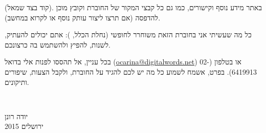 (קוד  בצד שמאל). באתר מידע נוסף וקישורים, כמו גם כל קבצי המקור של החוברת וקובץ מוכן להדפסה (אם תרצו ליצור עותק נוסף או לקרוא במחשב).

כל מה שעשיתי אני בחוברת הזאת משוחרר לחופשי (נחלת הכלל, ): אתם יכולים להעתיק, לשנות, להפיץ ולהשתמש בה כרצונכם.

בכל עניין, אל תהססו לפנות אלי בדואל (\url{ocarina@digitalwords.net}) או בטלפון (02-6419913). בפרט, אשמח לשמוע כל מה יש לכם להגיד על החוברת, ולקבל הצעות, שיפורים ותיקונים.

\vspace{\baselineskip}
~\hfill
\begin{minipage}{3cm}
	יודה רונן\\
	ירושלים 2015\\
\end{minipage}
